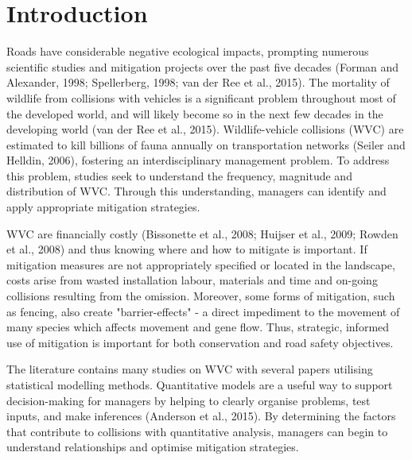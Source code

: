 \newpage
\section{Introduction}

Roads have considerable negative ecological impacts, prompting numerous scientific studies and mitigation projects over the past five decades (Forman and Alexander, 1998; Spellerberg, 1998; van der Ree et al., 2015). The mortality of wildlife from collisions with vehicles is a significant problem throughout most of the developed world, and will likely become so in the next few decades in the developing world (van der Ree et al., 2015). Wildlife-vehicle collisions (WVC) are estimated to kill billions of fauna annually on transportation networks (Seiler and Helldin, 2006), fostering an interdisciplinary management problem. To address this problem, studies seek to understand the frequency, magnitude and distribution of WVC.  Through this understanding, managers can identify and apply appropriate mitigation strategies.

WVC are financially costly (Bissonette et al., 2008; Huijser et al., 2009; Rowden et al., 2008) and thus knowing where and how to mitigate is important.  If mitigation measures are not appropriately specified or located in the landscape, costs arise from wasted installation labour, materials and time and on-going collisions resulting from the omission.  Moreover, some forms of mitigation, such as fencing, also create "barrier-effects" - a direct impediment to the movement of many species which affects movement and gene flow.  Thus, strategic, informed use of mitigation is important for both conservation and road safety objectives.

The literature contains many studies on WVC with several papers utilising statistical modelling methods.  Quantitative models are a useful way to support decision-making for managers by helping to clearly organise problems, test inputs, and make inferences (Anderson et al., 2015).  By determining the factors that contribute to collisions with quantitative analysis, managers can begin to understand relationships and optimise mitigation strategies.

